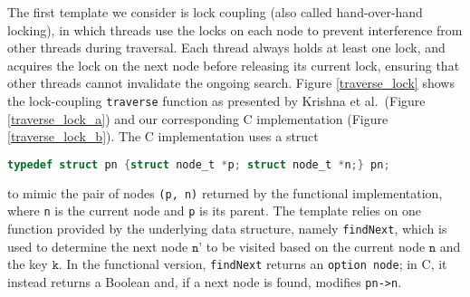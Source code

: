 \documentclass[sigplan,10pt,anonymous,review]{acmart}\settopmatter{printfolios=true,printccs=false,printacmref=false}
\begin{document}
The first template we consider is lock coupling (also called hand-over-hand locking), in which threads use the locks on each node to prevent interference from other threads during traversal. Each thread always holds at least one lock, and acquires the lock on the next node before releasing its current lock, ensuring that other threads cannot invalidate the ongoing search.
Figure \ref{traverse_lock} shows the lock-coupling \lstinline{traverse} function as presented by Krishna et al.~(Figure \ref{traverse_lock_a}) and our corresponding C implementation (Figure \ref{traverse_lock_b}). The C implementation uses a struct
\begin{lstlisting}[language = C, backgroundcolor=\color{white}, basicstyle=\ttfamily\footnotesize, xleftmargin=-2.07em]
	typedef struct pn {struct node_t *p; struct node_t *n;} pn;
\end{lstlisting}
to mimic the pair of nodes \lstinline{(p, n)} returned by the functional implementation, where \lstinline{n} is the current node and \lstinline{p} is its parent. The template relies on one function provided by the underlying data structure, namely \lstinline{findNext}, which is used to determine the next node $\texttt{n'}$ to be visited based on the current node $\texttt{n}$ and the key $\texttt{k}$. In the functional version, \lstinline{findNext} returns an \lstinline{option node}; in C, it instead returns a Boolean and, if a next node is found, modifies \lstinline{pn->n}.

\end{document}
